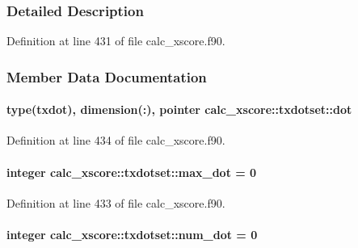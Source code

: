 \subsubsection{Detailed Description}


Definition at line 431 of file calc\-\_\-xscore.\-f90.



\subsubsection{Member Data Documentation}
\hypertarget{structcalc__xscore_1_1txdotset_a3fe8e9a3664a7ed0efb20b551bfd56f6}{
\paragraph[{dot}]{\setlength{\rightskip}{0pt plus 5cm}type({\bf txdot}), dimension(\-:), pointer calc\-\_\-xscore\-::txdotset\-::dot}}\label{structcalc__xscore_1_1txdotset_a3fe8e9a3664a7ed0efb20b551bfd56f6}


Definition at line 434 of file calc\-\_\-xscore.\-f90.

\hypertarget{structcalc__xscore_1_1txdotset_a60526972e3776bf8ba4ac06ebf808888}{
\paragraph[{max\-\_\-dot}]{\setlength{\rightskip}{0pt plus 5cm}integer calc\-\_\-xscore\-::txdotset\-::max\-\_\-dot = 0}}\label{structcalc__xscore_1_1txdotset_a60526972e3776bf8ba4ac06ebf808888}


Definition at line 433 of file calc\-\_\-xscore.\-f90.

\hypertarget{structcalc__xscore_1_1txdotset_a6568371b84c0207109a619d0f39c8cc9}{
\paragraph[{num\-\_\-dot}]{\setlength{\rightskip}{0pt plus 5cm}integer calc\-\_\-xscore\-::txdotset\-::num\-\_\-dot = 0}}\label{structcalc__xscore_1_1txdotset_a6568371b84c0207109a619d0f39c8cc9}


